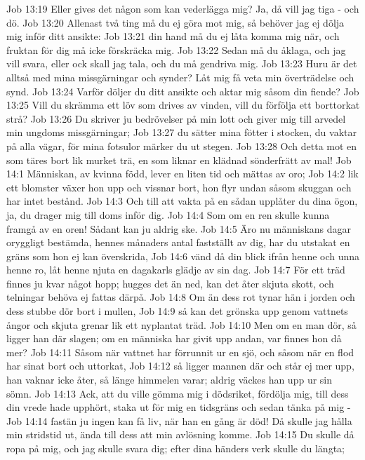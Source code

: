 Job 13:19  Eller gives det någon som kan vederlägga mig? Ja, då vill jag tiga - och dö.
Job 13:20  Allenast två ting må du ej göra mot mig, så behöver jag ej dölja mig inför ditt ansikte:
Job 13:21  din hand må du ej låta komma mig när, och fruktan för dig må icke förskräcka mig.
Job 13:22  Sedan må du åklaga, och jag vill svara, eller ock skall jag tala, och du må gendriva mig.
Job 13:23  Huru är det alltså med mina missgärningar och synder? Låt mig få veta min överträdelse och synd.
Job 13:24  Varför döljer du ditt ansikte och aktar mig såsom din fiende?
Job 13:25  Vill du skrämma ett löv som drives av vinden, vill du förfölja ett borttorkat strå?
Job 13:26  Du skriver ju bedrövelser på min lott och giver mig till arvedel min ungdoms missgärningar;
Job 13:27  du sätter mina fötter i stocken, du vaktar på alla vägar, för mina fotsulor märker du ut stegen.
Job 13:28  Och detta mot en som täres bort lik murket trä, en som liknar en klädnad sönderfrätt av mal!
Job 14:1  Människan, av kvinna född, lever en liten tid och mättas av oro;
Job 14:2  lik ett blomster växer hon upp och vissnar bort, hon flyr undan såsom skuggan och har intet bestånd.
Job 14:3  Och till att vakta på en sådan upplåter du dina ögon, ja, du drager mig till doms inför dig.
Job 14:4  Som om en ren skulle kunna framgå av en oren! Sådant kan ju aldrig ske.
Job 14:5  Äro nu människans dagar oryggligt bestämda, hennes månaders antal fastställt av dig, har du utstakat en gräns som hon ej kan överskrida,
Job 14:6  vänd då din blick ifrån henne och unna henne ro, låt henne njuta en dagakarls glädje av sin dag.
Job 14:7  För ett träd finnes ju kvar något hopp; hugges det än ned, kan det åter skjuta skott, och telningar behöva ej fattas därpå.
Job 14:8  Om än dess rot tynar hän i jorden och dess stubbe dör bort i mullen,
Job 14:9  så kan det grönska upp genom vattnets ångor och skjuta grenar lik ett nyplantat träd.
Job 14:10  Men om en man dör, så ligger han där slagen; om en människa har givit upp andan, var finnes hon då mer?
Job 14:11  Såsom när vattnet har förrunnit ur en sjö, och såsom när en flod har sinat bort och uttorkat,
Job 14:12  så ligger mannen där och står ej mer upp, han vaknar icke åter, så länge himmelen varar; aldrig väckes han upp ur sin sömn.
Job 14:13  Ack, att du ville gömma mig i dödsriket, fördölja mig, till dess din vrede hade upphört, staka ut för mig en tidsgräns och sedan tänka på mig -
Job 14:14  fastän ju ingen kan få liv, när han en gång är död! Då skulle jag hålla min stridstid ut, ända till dess att min avlösning komme.
Job 14:15  Du skulle då ropa på mig, och jag skulle svara dig; efter dina händers verk skulle du längta;
